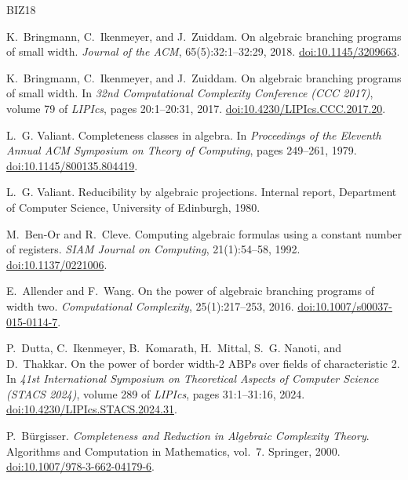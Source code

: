 \begin{thebibliography}{BIZ18}

K.~Bringmann, C.~Ikenmeyer, and J.~Zuiddam.
\newblock On algebraic branching programs of small width.
\newblock \emph{Journal of the ACM}, 65(5):32:1--32:29, 2018.
\newblock \href{https://doi.org/10.1145/3209663}{doi:10.1145/3209663}.

K.~Bringmann, C.~Ikenmeyer, and J.~Zuiddam.
\newblock On algebraic branching programs of small width.
\newblock In \emph{32nd Computational Complexity Conference (CCC 2017)},
  volume 79 of \emph{LIPIcs}, pages 20:1--20:31, 2017.
\newblock \href{https://doi.org/10.4230/LIPIcs.CCC.2017.20}{doi:10.4230/LIPIcs.CCC.2017.20}.

L.~G. Valiant.
\newblock Completeness classes in algebra.
\newblock In \emph{Proceedings of the Eleventh Annual ACM Symposium on Theory of Computing},
  pages 249--261, 1979.
\newblock \href{https://doi.org/10.1145/800135.804419}{doi:10.1145/800135.804419}.

L.~G. Valiant.
\newblock Reducibility by algebraic projections.
\newblock Internal report, Department of Computer Science, University of Edinburgh, 1980.

M.~Ben-Or and R.~Cleve.
\newblock Computing algebraic formulas using a constant number of registers.
\newblock \emph{SIAM Journal on Computing}, 21(1):54--58, 1992.
\newblock \href{https://doi.org/10.1137/0221006}{doi:10.1137/0221006}.

E.~Allender and F.~Wang.
\newblock On the power of algebraic branching programs of width two.
\newblock \emph{Computational Complexity}, 25(1):217--253, 2016.
\newblock \href{https://doi.org/10.1007/s00037-015-0114-7}{doi:10.1007/s00037-015-0114-7}.

P.~Dutta, C.~Ikenmeyer, B.~Komarath, H.~Mittal, S.~G. Nanoti, and D.~Thakkar.
\newblock On the power of border width-2 {ABP}s over fields of characteristic 2.
\newblock In \emph{41st International Symposium on Theoretical Aspects of Computer Science
  (STACS 2024)}, volume 289 of \emph{LIPIcs}, pages 31:1--31:16, 2024.
\newblock \href{https://doi.org/10.4230/LIPIcs.STACS.2024.31}{doi:10.4230/LIPIcs.STACS.2024.31}.

P.~Bürgisser.
\newblock \emph{Completeness and Reduction in Algebraic Complexity Theory}.
\newblock Algorithms and Computation in Mathematics, vol.~7. Springer, 2000.
\newblock \href{https://doi.org/10.1007/978-3-662-04179-6}{doi:10.1007/978-3-662-04179-6}.


\end{thebibliography}
